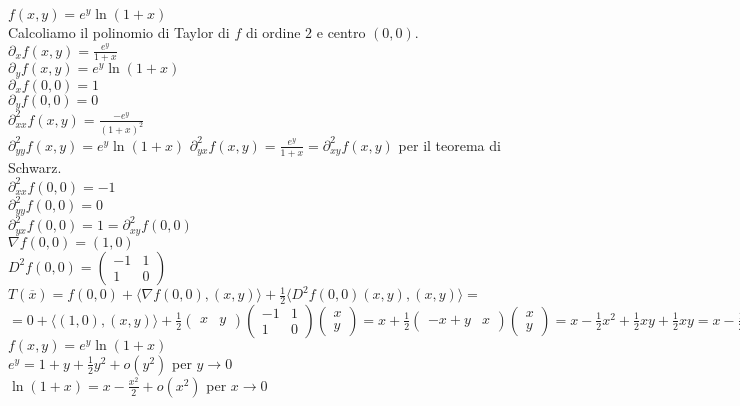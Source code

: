 \begin{exbar}
\begin{example}
	
	$f(x,y)=e^y\ln(1+x)$\\
	Calcoliamo il polinomio di Taylor di $f$ di ordine $2$ e centro $(0,0)$.\\
	$\partial_xf(x,y)=\frac{e^y}{1+x}$\\
	$\partial_y f(x,y) =e^y \ln(1+x)$\\
	$\partial_xf(0,0)=1$\\
	$\partial_y f(0,0)=0$\\
	$\partial_{xx}^2f(x,y)=\frac{-e^y}{(1+x)^2}$\\
	$\partial_{yy}^2f(x,y)=e^y\ln(1+x)$
	$\partial_{yx}^2 f(x,y)=\frac{e^y}{1+x}=\partial_{xy}^2f(x,y)$ per il teorema di Schwarz.\\
	$\partial_{xx}^2f(0,0)=-1$\\
	$\partial_{yy}^2f(0,0)=0$\\
	$\partial_{yx}^2f(0,0)=1=\partial_{xy}^2f(0,0)$\\
	$\nabla f(0,0)=(1,0)$\\
	$D^2f(0,0)=\begin{pmatrix}
		-1&1\\
		1&0
	\end{pmatrix}$\\
	$T(\overline{x})=f(0,0)+\langle\nabla f(0,0),(x,y) \rangle + \frac{1}{2}\langle D^2f(0,0)(x,y),(x,y) \rangle=$\\$=0+\langle (1,0),(x,y) \rangle + \frac{1}{2}\begin{pmatrix}
		x&y
	\end{pmatrix}\begin{pmatrix}
		-1& 1\\
		1 &0
	\end{pmatrix} \begin{pmatrix}
		x\\
		y
	\end{pmatrix}=x+\frac{1}{2}\begin{pmatrix}
		-x+y & x
	\end{pmatrix}\begin{pmatrix}
		x\\
		y
	\end{pmatrix}=x-\frac{1}{2}x^2+\frac{1}{2}xy+\frac{1}{2}xy=x-\frac{1}{2}x^2+xy$\\
	$f(x,y)=e^y\ln(1+x)$\\
	$e^y=1+y+\frac{1}{2}y^2+o(y^2)$ per $y \rightarrow0$\\
	$\ln(1+x)=x-\frac{x^2}{2}+o(x^2)$ per $x \rightarrow 0$\\

\end{example}
\end{exbar}
